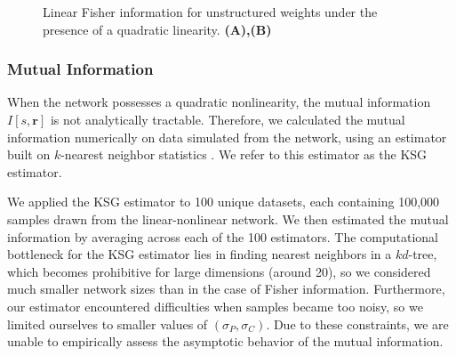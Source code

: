\documentclass[12pt]{article}
\begin{document}
\begin{figure}[t]
	\centering
	\caption{Linear Fisher information for unstructured weights under the presence of a quadratic linearity. \textbf{(A),(B)} } 
	\label{fig:fisher-quadratic-common}
\end{figure}
	
\subsubsection{Mutual Information}
When the network possesses a quadratic nonlinearity, the mutual information $I[s,\mathbf{r}]$ is not analytically tractable. Therefore, we calculated the mutual information numerically on data simulated from the network, using an estimator built on $k$-nearest neighbor statistics \citep{kraskov2004}. We refer to this estimator as the KSG estimator. 
	
We applied the KSG estimator to 100 unique datasets, each containing 100,000 samples drawn from the linear-nonlinear network. We then estimated the mutual information by averaging across each of the 100 estimators. The computational bottleneck for the KSG estimator lies in finding nearest neighbors in a $kd$-tree, which becomes prohibitive for large dimensions (around 20), so we considered much smaller network sizes than in the case of Fisher information. Furthermore, our estimator encountered difficulties when samples became too noisy, so we limited ourselves to smaller values of $(\sigma_P, \sigma_C)$. Due to these constraints, we are unable to empirically assess the asymptotic behavior of the mutual information.
	
\end{document}
